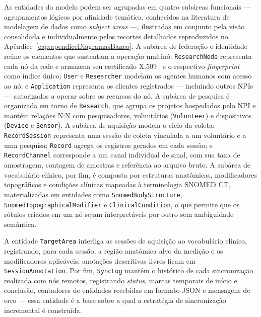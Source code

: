 As entidades do modelo podem ser agrupadas em quatro subáreas funcionais --- agrupamentos lógicos por afinidade temática, conhecidos na literatura de modelagem de dados como \textit{subject areas} ---, ilustradas em conjunto pela visão consolidada e individualmente pelos recortes detalhados reproduzidos no Apêndice~\ref{cap:apendiceDiagramasBanco}. A subárea de federação e identidade reúne os elementos que sustentam a operação multinó: \texttt{ResearchNode} representa cada nó da rede e armazena seu certificado X.509~\cite{rfc5280} e o respectivo \textit{fingerprint} como índice único; \texttt{User} e \texttt{Researcher} modelam os agentes humanos com acesso ao nó; e \texttt{Application} representa os clientes registrados --- incluindo outros NPIs --- autorizados a operar sobre os recursos do nó. A subárea de pesquisa é organizada em torno de \texttt{Research}, que agrupa os projetos hospedados pelo NPI e mantém relações N:N com pesquisadores, voluntários (\texttt{Volunteer}) e dispositivos (\texttt{Device} e \texttt{Sensor}). A subárea de aquisição modela o ciclo da coleta: \texttt{RecordSession} representa uma sessão de coleta vinculada a um voluntário e a uma pesquisa; \texttt{Record} agrega os registros gerados em cada sessão; e \texttt{RecordChannel} corresponde a um canal individual de sinal, com sua taxa de amostragem, contagem de amostras e referência ao arquivo bruto. A subárea de vocabulário clínico, por fim, é composta por estruturas anatômicas, modificadores topográficos e condições clínicas mapeadas à terminologia SNOMED CT, materializadas em entidades como \texttt{SnomedBodyStructure}, \texttt{SnomedTopographicalModifier} e \texttt{ClinicalCondition}, o que permite que os rótulos criados em um nó sejam interpretáveis por outro sem ambiguidade semântica.

A entidade \texttt{TargetArea} interliga as sessões de aquisição ao vocabulário clínico, registrando, para cada sessão, a região anatômica alvo da medição e os modificadores aplicáveis; anotações descritivas livres ficam em \texttt{SessionAnnotation}. Por fim, \texttt{SyncLog} mantém o histórico de cada sincronização realizada com nós remotos, registrando \textit{status}, marcas temporais de início e conclusão, contadores de entidades recebidas em formato JSON e mensagens de erro --- essa entidade é a base sobre a qual a estratégia de sincronização incremental é construída.



